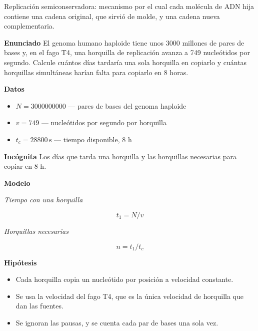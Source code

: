 \documentclass{book}
\begin{document}
\begin{tcolorbox}[title={Definición}, studiumdef, breakable]

Replicación semiconservadora: mecanismo por el cual cada molécula de ADN hija contiene una cadena original, que sirvió de molde, y una cadena nueva complementaria.

\end{tcolorbox}

\begin{tcolorbox}[title={Problema resuelto}, studiumworked, breakable]

\noindent\textbf{Enunciado}
El genoma humano haploide tiene unos 3000 millones de pares de bases y, en el fago T4, una horquilla de replicación avanza a 749 nucleótidos por segundo. Calcule cuántos días tardaría una sola horquilla en copiarlo y cuántas horquillas simultáneas harían falta para copiarlo en 8 horas.


\noindent\textbf{Datos}
\begin{itemize}
\item $N = 3000000000$ — pares de bases del genoma haploide
\item $v = 749$ — nucleótidos por segundo por horquilla
\item $t_{c} = 28800\,\mathrm{s}$ — tiempo disponible, 8 h
\end{itemize}

\noindent\textbf{Incógnita}
Los días que tarda una horquilla y las horquillas necesarias para copiar en 8 h.


\noindent\textbf{Modelo}

\noindent\textit{Tiempo con una horquilla}

\[
t_1 = N / v
\]

\noindent\textit{Horquillas necesarias}

\[
n = t_1 / t_c
\]

\noindent\textbf{Hipótesis}
\begin{itemize}
\item Cada horquilla copia un nucleótido por posición a velocidad constante.
\item Se usa la velocidad del fago T4, que es la única velocidad de horquilla que dan las fuentes.
\item Se ignoran las pausas, y se cuenta cada par de bases una sola vez.
\end{itemize}


\end{tcolorbox}
\end{document}
